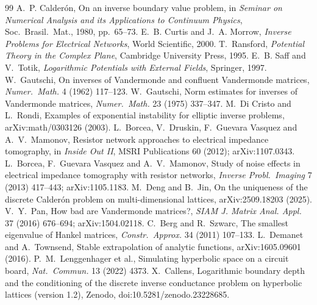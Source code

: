 \documentclass[11pt,a4paper]{article}
\begin{document}
\begin{thebibliography}{99}
 A.~P. Calder\'on, On an inverse boundary value problem, in \emph{Seminar on Numerical Analysis and its
Applications to Continuum Physics}, Soc.\ Brasil.\ Mat., 1980, pp.~65--73.
 E.~B. Curtis and J.~A. Morrow, \emph{Inverse Problems for Electrical Networks}, World Scientific, 2000.
 T.~Ransford, \emph{Potential Theory in the Complex Plane}, Cambridge University Press, 1995.
 E.~B. Saff and V.~Totik, \emph{Logarithmic Potentials with External Fields}, Springer, 1997.
 W.~Gautschi, On inverses of Vandermonde and confluent Vandermonde matrices, \emph{Numer.\ Math.} 4 (1962) 117--123.
 W.~Gautschi, Norm estimates for inverses of Vandermonde matrices, \emph{Numer.\ Math.} 23 (1975) 337--347.
 M.~Di Cristo and L.~Rondi, Examples of exponential instability for elliptic inverse problems, arXiv:math/0303126 (2003).
 L.~Borcea, V.~Druskin, F.~Guevara Vasquez and A.~V.~Mamonov, Resistor network approaches to electrical impedance tomography,
in \emph{Inside Out II}, MSRI Publications 60 (2012); arXiv:1107.0343.
 L.~Borcea, F.~Guevara Vasquez and A.~V.~Mamonov, Study of noise effects in electrical impedance tomography with resistor networks,
\emph{Inverse Probl.\ Imaging} 7 (2013) 417--443; arXiv:1105.1183.
 M.~Deng and B.~Jin, On the uniqueness of the discrete Calder\'on problem on multi-dimensional lattices, arXiv:2509.18203 (2025).
 V.~Y.~Pan, How bad are Vandermonde matrices?, \emph{SIAM J. Matrix Anal. Appl.} 37 (2016) 676--694; arXiv:1504.02118.
 C.~Berg and R.~Szwarc, The smallest eigenvalue of Hankel matrices, \emph{Constr.\ Approx.} 34 (2011) 107--133.
 L.~Demanet and A.~Townsend, Stable extrapolation of analytic functions, arXiv:1605.09601 (2016).
 P.~M.~Lenggenhager et al., Simulating hyperbolic space on a circuit board, \emph{Nat.\ Commun.} 13 (2022) 4373.
 X.~Callens, Logarithmic boundary depth and the conditioning of the discrete inverse conductance problem on hyperbolic
lattices (version 1.2), Zenodo, doi:10.5281/zenodo.23228685.
\end{thebibliography}
\end{document}
